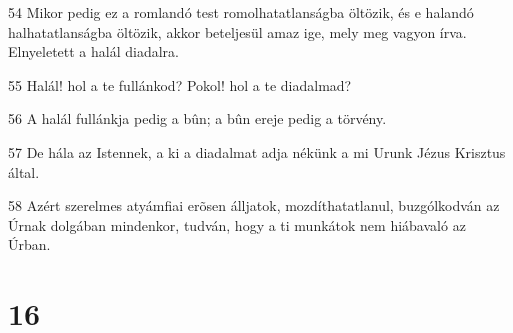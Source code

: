 \par 54 Mikor pedig ez a romlandó test romolhatatlanságba öltözik, és e halandó halhatatlanságba öltözik, akkor beteljesül amaz ige, mely meg vagyon írva. Elnyeletett a halál diadalra.
\par 55 Halál! hol a te fullánkod? Pokol! hol a te diadalmad?
\par 56 A halál fullánkja pedig a bûn; a bûn ereje  pedig a törvény.
\par 57 De hála az Istennek, a ki a diadalmat adja nékünk a mi Urunk Jézus Krisztus által.
\par 58 Azért szerelmes atyámfiai erõsen álljatok, mozdíthatatlanul, buzgólkodván az Úrnak  dolgában mindenkor, tudván, hogy a ti munkátok nem hiábavaló az Úrban.

\chapter{16}

